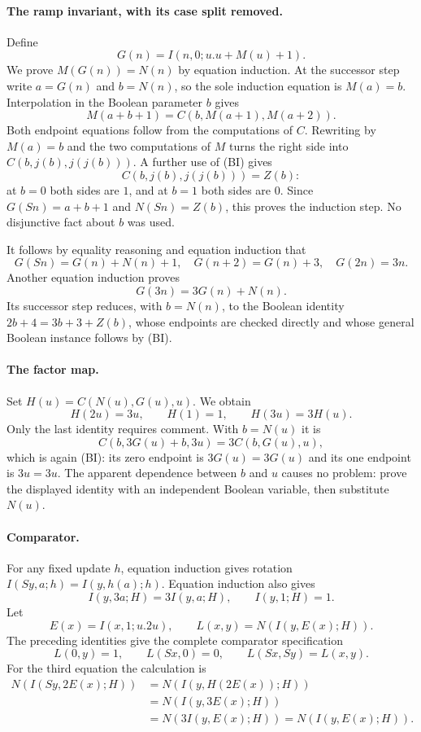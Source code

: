 \paragraph{The ramp invariant, with its case split removed.}
Define
\[
 G(n)=I(n,0;u.u+M(u)+1).
\]
We prove $M(G(n))=N(n)$ by equation induction.  At the successor step
write $a=G(n)$ and $b=N(n)$, so the sole induction equation is $M(a)=b$.
Interpolation in the Boolean parameter $b$ gives
\[
 M(a+b+1)=C(b,M(a+1),M(a+2)).
\]
Both endpoint equations follow from the computations of $C$.  Rewriting
by $M(a)=b$ and the two computations of $M$ turns the right side into
$C(b,j(b),j(j(b)))$.  A further use of (BI) gives
\[
 C(b,j(b),j(j(b)))=Z(b):
\]
at $b=0$ both sides are $1$, and at $b=1$ both sides are $0$.
Since $G(Sn)=a+b+1$ and $N(Sn)=Z(b)$, this proves the induction step.
No disjunctive fact about $b$ was used.

It follows by equality reasoning and equation induction that
\[
 G(Sn)=G(n)+N(n)+1,\quad G(n+2)=G(n)+3,\quad G(2n)=3n.
\]
Another equation induction proves
\[
 G(3n)=3G(n)+N(n).
\]
Its successor step reduces, with $b=N(n)$, to the Boolean identity
$2b+4=3b+3+Z(b)$, whose endpoints are checked directly and whose
general Boolean instance follows by (BI).

\paragraph{The factor map.}
Set $H(u)=C(N(u),G(u),u)$.  We obtain
\[
 H(2u)=3u,\qquad H(1)=1,\qquad H(3u)=3H(u).
\]
Only the last identity requires comment.  With $b=N(u)$ it is
\[
 C(b,3G(u)+b,3u)=3C(b,G(u),u),
\]
which is again (BI): its zero endpoint is $3G(u)=3G(u)$ and its one
endpoint is $3u=3u$.  The apparent dependence between $b$ and $u$
causes no problem: prove the displayed identity with an independent
Boolean variable, then substitute $N(u)$.

\paragraph{Comparator.}
For any fixed update $h$, equation induction gives rotation
$I(Sy,a;h)=I(y,h(a);h)$.  Equation induction also gives
\[
 I(y,3a;H)=3I(y,a;H),\qquad I(y,1;H)=1.
\]
Let
\[
 E(x)=I(x,1;u.2u),\qquad L(x,y)=N(I(y,E(x);H)).
\]
The preceding identities give the complete comparator specification
\[
 L(0,y)=1,\qquad L(Sx,0)=0,\qquad L(Sx,Sy)=L(x,y).
\]
For the third equation the calculation is
\[
\begin{aligned}
 N(I(Sy,2E(x);H))
 &=N(I(y,H(2E(x));H))\\
 &=N(I(y,3E(x);H))\\
 &=N(3I(y,E(x);H))=N(I(y,E(x);H)).
\end{aligned}
\]

